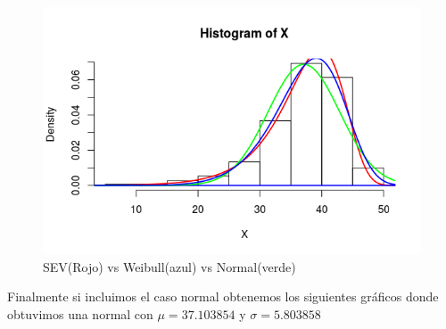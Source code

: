 \documentclass{article}
\begin{document}
\begin{figure}[h!]
\centering
\includegraphics[scale=0.5]{./figures/los3.png}
\caption{SEV(Rojo) vs Weibull(azul) vs Normal(verde)}
\end{figure}
Finalmente si incluimos el caso normal obtenemos los siguientes gráficos donde obtuvimos una normal con $\mu =37.103854$ y $\sigma = 5.803858$\\

\pagebreak
\end{document}
